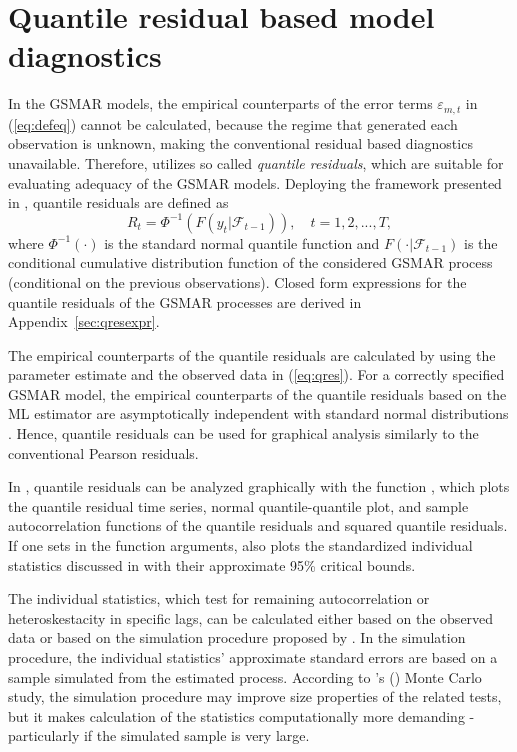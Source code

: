 \documentclass[nojss]{jss} %
\begin{document}
\section{Quantile residual based model diagnostics}\label{sec:qres}
In the GSMAR models, the empirical counterparts of the error terms $\varepsilon_{m,t}$ in (\ref{eq:defeq}) cannot be calculated, because the regime that generated each observation is unknown, making the conventional residual based diagnostics unavailable. Therefore,  utilizes so called \emph{quantile residuals}, which are suitable for evaluating adequacy of the GSMAR models. Deploying the framework presented in \cite{Kalliovirta:2012}, quantile residuals are defined as
%
\begin{equation}\label{eq:qres}
R_t=\Phi^{-1}(F(y_t|\mathcal{F}_{t-1})), \quad t=1,2,...,T,
\end{equation}
%
where $\Phi^{-1}(\cdot)$ is the standard normal quantile function and $F(\cdot|\mathcal{F}_{t-1})$ is the conditional cumulative distribution function of the considered GSMAR process (conditional on the previous observations). Closed form expressions for the quantile residuals of the GSMAR processes are derived in Appendix~\ref{sec:qresexpr}.
%

The empirical counterparts of the quantile residuals are calculated by using the parameter estimate and the observed data in (\ref{eq:qres}). For a correctly specified GSMAR model, the empirical counterparts of the quantile residuals based on the ML estimator are asymptotically independent with standard normal distributions \citep[Lemma 2.1]{Kalliovirta:2012}. Hence, quantile residuals can be used for graphical analysis similarly to the conventional Pearson residuals.

In , quantile residuals can be analyzed graphically with the function , which plots the quantile residual time series, normal quantile-quantile plot, and sample autocorrelation functions of the quantile residuals and squared quantile residuals. If one sets  in the function arguments,  also plots the standardized individual statistics discussed in \citet[pp. 369-370]{Kalliovirta:2012} with their approximate 95\% critical bounds.

The individual statistics, which test for remaining autocorrelation or heteroskestacity in specific lags, can be calculated either based on the observed data or based on the simulation procedure proposed by \cite{Kalliovirta:2012}. In the simulation procedure, the individual statistics' approximate standard errors are based on a sample simulated from the estimated process. According to \citeauthor{Kalliovirta:2012}'s (\citeyear{Kalliovirta:2012}) Monte Carlo study, the simulation procedure may improve size properties of the related tests, but it makes calculation of the statistics computationally more demanding - particularly if the simulated sample is very large.
\end{document}
